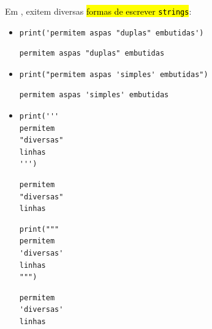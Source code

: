 Em {\python}, exitem diversas \hl{formas de escrever \texttt{strings}}:
\begin{itemize}
\item {}

\begin{lstlisting}[xrightmargin=2.5em]
print('permitem aspas "duplas" embutidas')
\end{lstlisting}

\begin{verbatim}
permitem aspas "duplas" embutidas
\end{verbatim}

\item {}

\begin{lstlisting}[xrightmargin=2.5em]
print("permitem aspas 'simples' embutidas")
\end{lstlisting}

\begin{verbatim}
permitem aspas 'simples' embutidas
\end{verbatim}

\item {}

\begin{lstlisting}[xrightmargin=2.5em]
print('''
permitem
"diversas"
linhas
''')
\end{lstlisting}

\begin{verbatim}
permitem
"diversas"
linhas  
\end{verbatim}

\begin{lstlisting}
print("""
permitem
'diversas'
linhas
""")
\end{lstlisting}

\begin{verbatim}
permitem
'diversas'
linhas  
\end{verbatim}
  
\end{itemize}

